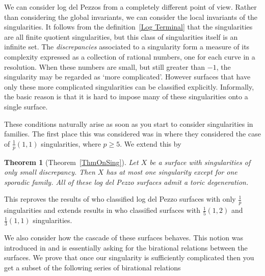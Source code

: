\documentclass[12pt,a4paper]{book}      %
\newtheorem{thm}{Theorem}[section]
\theoremstyle{definition}
\begin{document}
We can consider log del Pezzos from a completely different point of view. Rather than considering the global invariants, we can consider the local invariants of the singularities. 
It follows from the definition~\ref{Log Terminal} that the singularities
are all finite quotient singularities, but this class of singularities itself is an infinite set. 
The {\em discrepancies} associated to a singularity form a measure of
its complexity expressed as a collection of rational numbers, one for each curve in a resolution. 
When these numbers are small, but still greater than $-1$, the singularity may be regarded as `more complicated'. 
However surfaces that have only these more complicated singularities can be classified explicitly. Informally,
the basic reason is that it is hard to impose many of these singularities onto a single surface.

These conditions naturally arise as soon as you start to consider singularities in families. The first place this was considered was in \cite{CP} where they considered the case of $\frac{1}{p}(1,1)$ singularities, where $p \geq 5$. We extend this by


\begin{thm}[Theorem~\ref{ThmOnSing}]
Let $X$ be a surface with singularities of only small discrepancy. Then $X$ has at most one singularity except for one sporadic family. All of these log del Pezzo surfaces admit a toric degeneration.
\end{thm}

This reproves the results of \cite{CP} who classified log del Pezzo surfaces with only $\frac{1}{p}$ singularities and extends results in \cite{Cuzz} who classified surfaces with $\frac{1}{5}(1,2)$  and $\frac{1}{3}(1,1)$ singularities.

We also consider how the cascade of these surfaces behaves. This notion was introduced in \cite{MR2053462} and is essentially asking for the birational relations between the surfaces. We prove that once our singularity is sufficiently complicated then you get a subset of the following series of birational relations
\end{document}
